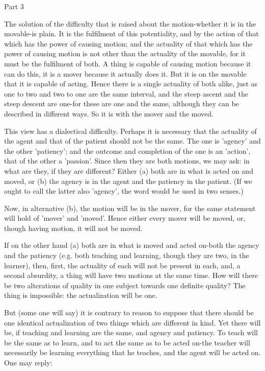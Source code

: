 Part 3

The solution of the difficulty that is raised about the motion-whether
it is in the movable-is plain. It is the fulfilment of this potentiality,
and by the action of that which has the power of causing motion; and
the actuality of that which has the power of causing motion is not
other than the actuality of the movable, for it must be the fulfilment
of both. A thing is capable of causing motion because it can do this,
it is a mover because it actually does it. But it is on the movable
that it is capable of acting. Hence there is a single actuality of
both alike, just as one to two and two to one are the same interval,
and the steep ascent and the steep descent are one-for these are one
and the same, although they can be described in different ways. So
it is with the mover and the moved. 

This view has a dialectical difficulty. Perhaps it is necessary that
the actuality of the agent and that of the patient should not be the
same. The one is 'agency' and the other 'patiency'; and the outcome
and completion of the one is an 'action', that of the other a 'passion'.
Since then they are both motions, we may ask: in what are they, if
they are different? Either (a) both are in what is acted on and moved,
or (b) the agency is in the agent and the patiency in the patient.
(If we ought to call the latter also 'agency', the word would be used
in two senses.) 

Now, in alternative (b), the motion will be in the mover, for the
same statement will hold of 'mover' and 'moved'. Hence either every
mover will be moved, or, though having motion, it will not be moved.

If on the other hand (a) both are in what is moved and acted on-both
the agency and the patiency (e.g. both teaching and learning, though
they are two, in the learner), then, first, the actuality of each
will not be present in each, and, a second absurdity, a thing will
have two motions at the same time. How will there be two alterations
of quality in one subject towards one definite quality? The thing
is impossible: the actualization will be one. 

But (some one will say) it is contrary to reason to suppose that there
should be one identical actualization of two things which are different
in kind. Yet there will be, if teaching and learning are the same,
and agency and patiency. To teach will be the same as to learn, and
to act the same as to be acted on-the teacher will necessarily be
learning everything that he teaches, and the agent will be acted on.
One may reply: 

